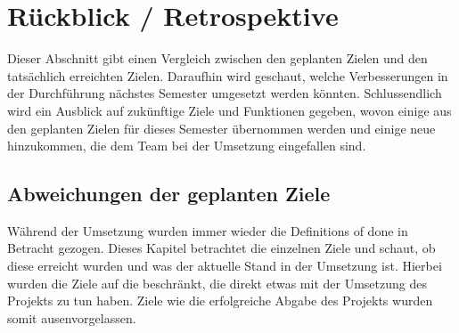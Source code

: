 \section{Rückblick / Retrospektive}\label{sec:rueckblick-retrospektive}

Dieser Abschnitt gibt einen Vergleich zwischen den geplanten Zielen und den tatsächlich erreichten Zielen.
Daraufhin wird geschaut, welche Verbesserungen in der Durchführung nächstes Semester umgesetzt werden könnten.
Schlussendlich wird ein Ausblick auf zukünftige Ziele und Funktionen gegeben, wovon einige aus den geplanten Zielen für dieses Semester übernommen werden und einige neue hinzukommen, die dem Team bei der Umsetzung eingefallen sind.

\subsection{Abweichungen der geplanten Ziele}\label{subsec:abweichungen-der-geplanten-ziele}
Während der Umsetzung wurden immer wieder die Definitions of done in Betracht gezogen.
Dieses Kapitel betrachtet die einzelnen Ziele und schaut, ob diese erreicht wurden und was der aktuelle Stand in der Umsetzung ist.
Hierbei wurden die Ziele auf die beschränkt, die direkt etwas mit der Umsetzung des Projekts zu tun haben.
Ziele wie die erfolgreiche Abgabe des Projekts wurden somit ausenvorgelassen.

